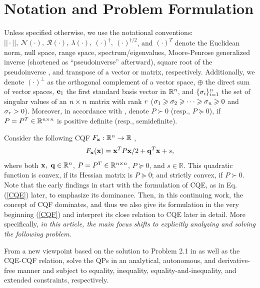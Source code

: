 \documentclass{imaman}
\newcommand{\beq}{\begin{eqnarray}}
\newcommand{\eeq}{\end{eqnarray}}
\newcommand{\bfx}{{\bf x}}
\newcommand{\bfq}{{\bf q}}
\newcommand{\bfe}{{\bf e}}
\newcommand{\real}{\mathbb{R}}
\newcommand{\calN}{{\mathcal N}}
\newcommand{\calR}{{\mathcal R}}
\newcommand{\itn}{{\it n}}
\newcommand{\itr}{{\it r}}
\numberwithin{equation}{section}
\begin{document}
\section{Notation and Problem Formulation}
\label{Sec_Notation_Problem}
Unless specified otherwise, we use the notational conventions: $||\cdot||,~\calN(\cdot),~\calR(\cdot),~\lambda(\cdot),~(\cdot)^\dagger,~(\cdot)^{\dagger/2}$, and $(\cdot)^T$ denote the Euclidean norm, null space, range space, spectrum/eigenvalues, Moore-Penrose generalized inverse (shortened as ``pseudoinverse'' afterward), square root of the pseudoinverse \cite{UrBlDr:13}, and transpose of a vector or matrix, respectively. Additionally, we denote $(\cdot)^\perp$ as the orthogonal complement of a vector space, $\oplus$ the direct sum of vector spaces, $\bfe_1$ the first standard basis vector in $\real^\itn$, and $\{\sigma_i\}_{i=1}^\itn$ the set of singular values of an $\itn\times\itn$ matrix with rank $\itr$ ($\sigma_1\ge\sigma_2\ge\cdots\ge\sigma_\itn\ge 0$ and $\sigma_\itr>0$). Moreover, in accordance with \cite{Lu(Ye):03(16)}, denote $P\succ 0$ (resp., $P\succeq 0$), if $P=P^T\in\real^{{\it n}\times {\it n}}$ is positive definite (resp., semidefinite).

Consider the following CQF $F_\bfx: \real^\itn\rightarrow\real$ \cite{Lu(Ye):03(16)},
\beq
F_\bfx(\bfx)=\bfx^TP\bfx/2+\bfq^T\bfx+s,
\label{CQF}
\eeq
where both $\bfx,~\bfq\in\real^{\it n}$, $P=P^T\in\real^{{\it n}\times {\it n}}$, $P\succeq 0$, and $s\in\real$. This quadratic function is convex, if its Hessian matrix is $P\succeq 0$; and strictly convex, if $P\succ 0$. Note that the early findings in \cite{LiLiHs:20} start with the formulation of CQE, as in Eq. (\ref{CQE}) later, to emphasize its dominance. Then, in this continuing work, the concept of CQF dominates, and thus we also give its formulation in the very beginning (\ref{CQF}) and interpret its close relation to CQE later in detail. More specifically, \textit{in this article, the main focus shifts to explicitly analyzing and solving the following problem.}

\begin{problem}
From a new viewpoint based on the solution to Problem 2.1 in \cite{LiLiHs:20} as well as the CQE-CQF relation, solve the QPs in an analytical, autonomous, and derivative-free manner and subject to equality, inequality, equality-and-inequality, and extended constraints, respectively.
\label{Prob_Convex_Optimization}
\end{problem}
\end{document}
